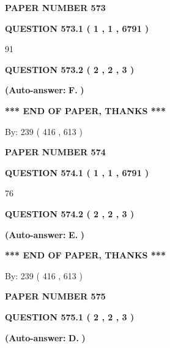 \documentclass{ctexart}
\begin{document}
   
\newpage 
\setcounter{page}{ 
   573001 } 
   
   
 {\textbf{ \Large{ PAPER NUMBER  573  }}}
   
   
   
   
  
  
{\textbf{\large{QUESTION
573.1 
 ( 1 , 1 , 6791 )
}}}

91
  
  
{\textbf{\large{QUESTION
573.2 
 ( 2 , 2 , 3 )
}}}
 
 
{\textbf{(Auto-answer:}}
{\textbf{\large{
F.}}}
{\textbf{)}}
 
 
   
   
   
   
\vspace{1.0in} 
{\textbf{\large{ *** END OF PAPER, THANKS *** }}} 
   
   
\hspace{1.0in} By: 
 239 ( 416 ,  613 )
   
   
   
   
\newpage 
\setcounter{page}{ 
   574001 } 
   
   
 {\textbf{ \Large{ PAPER NUMBER  574  }}}
   
   
   
   
  
  
{\textbf{\large{QUESTION
574.1 
 ( 1 , 1 , 6791 )
}}}

76
  
  
{\textbf{\large{QUESTION
574.2 
 ( 2 , 2 , 3 )
}}}
 
 
{\textbf{(Auto-answer:}}
{\textbf{\large{
E.}}}
{\textbf{)}}
 
 
   
   
   
   
\vspace{1.0in} 
{\textbf{\large{ *** END OF PAPER, THANKS *** }}} 
   
   
\hspace{1.0in} By: 
 239 ( 416 ,  613 )
   
   
   
   
\newpage 
\setcounter{page}{ 
   575001 } 
   
   
 {\textbf{ \Large{ PAPER NUMBER  575  }}}
   
   
   
   
  
  
{\textbf{\large{QUESTION
575.1 
 ( 2 , 2 , 3 )
}}}
 
 
{\textbf{(Auto-answer:}}
{\textbf{\large{
D.}}}
{\textbf{)}}
 
 
  
\end{document}

